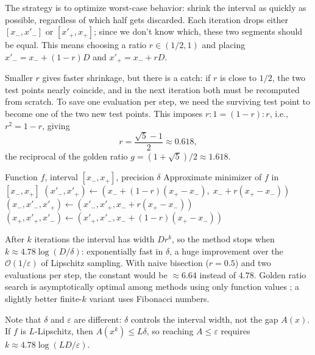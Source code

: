 The strategy is to optimize worst-case behavior: shrink the interval as quickly as possible, regardless of which half gets discarded.
Each iteration drops either $[x_-, x'_-]$ or $[x'_+, x_+]$; since we don't know which, these two segments should be equal.
This means choosing a ratio $r \in (1/2, 1)$ and placing $x'_- = x_- + (1-r)D$ and $x'_+ = x_- + rD$.

Smaller $r$ gives faster shrinkage, but there is a catch: if $r$ is close to $1/2$, the two test points nearly coincide, and in the next iteration both must be recomputed from scratch.
To save one evaluation per step, we need the surviving test point to become one of the two new test points.
This imposes $r : 1 = (1 - r) : r$, i.e., $r^2 = 1 - r$, giving
\begin{equation}\label{eq:golden-ratio}
	r = \frac{\sqrt{5} - 1}{2} \approx 0.618,
\end{equation}
the reciprocal of the golden ratio $g = (1 + \sqrt{5})/2 \approx 1.618$.

\begin{algorithm}
	\caption{Golden Ratio Search (GRS)}
	\label{alg:GRS}
	\begin{algorithmic}[1]
		\Require Function $f$, interval $[x_-, x_+]$, precision $\delta$
		\Ensure Approximate minimizer of $f$ in $[x_-, x_+]$
			\State $(x'_-, x'_+) \gets (x_- + (1-r)(x_+ - x_-),\; x_- + r(x_+ - x_-))$
					\State $(x_-, x'_-, x'_+) \gets (x'_-, x'_+, x_- + r(x_+ - x_-))$
				\Else
					\State $(x_+, x'_+, x'_-) \gets (x'_+, x'_-, x_- + (1-r)(x_+ - x_-))$
				\EndIf
			\EndWhile
		\EndProcedure
	\end{algorithmic}
\end{algorithm}

After $k$ iterations the interval has width $D r^k$, so the method stops when $k \approx 4.78 \log(D / \delta)$: exponentially fast in $\delta$, a huge improvement over the $\mathcal{O}(1/\varepsilon)$ of Lipschitz sampling.
With naive bisection ($r = 0.5$) and two evaluations per step, the constant would be $\approx 6.64$ instead of $4.78$.
Golden ratio search is asymptotically optimal among methods using only function values \cite{bazaraa2006}; a slightly better finite-$k$ variant uses Fibonacci numbers.

Note that $\delta$ and $\varepsilon$ are different: $\delta$ controls the interval width, not the gap $A(x)$.
If $f$ is $L$-Lipschitz, then $A(x^k) \leq L\delta$, so reaching $A \leq \varepsilon$ requires $k \approx 4.78 \log(LD / \varepsilon)$.



